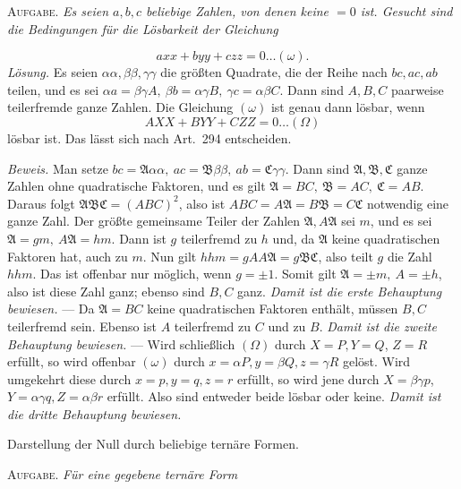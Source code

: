 \textsc{Aufgabe.} \textit{Es seien \(a,b,c\) beliebige Zahlen, von denen keine \(=0\) ist. Gesucht sind die Bedingungen für die Lösbarkeit der Gleichung}

\[axx+byy+czz=0\ldots(\omega).\]
\textit{Lösung.} Es seien \(\alpha\alpha,\beta\beta,\gamma\gamma\) die größten Quadrate, die der Reihe nach \(bc,ac,ab\) teilen, und es sei \(\alpha a=\beta\gamma A,\ \beta b=\alpha\gamma B,\ \gamma c=\alpha\beta C\). Dann sind \(A,B,C\) paarweise teilerfremde ganze Zahlen. Die Gleichung \((\omega)\) ist genau dann lösbar, wenn
\[AXX+BYY+CZZ=0\ldots(\Omega)\]
lösbar ist. Das lässt sich nach Art.\ 294 entscheiden.

\textit{Beweis.} Man setze \(bc=\mathfrak A\alpha\alpha,\ ac=\mathfrak B\beta\beta,\ ab=\mathfrak C\gamma\gamma\). Dann sind \(\mathfrak A,\mathfrak B,\mathfrak C\) ganze Zahlen ohne quadratische Faktoren, und es gilt \(\mathfrak A=BC,\ \mathfrak B=AC,\ \mathfrak C=AB\). Daraus folgt \(\mathfrak A\mathfrak B\mathfrak C=(ABC)^2\), also ist \(ABC=A\mathfrak A=B\mathfrak B=C\mathfrak C\) notwendig eine ganze Zahl. Der größte gemeinsame Teiler der Zahlen \(\mathfrak A,A\mathfrak A\) sei \(m\), und es sei \(\mathfrak A=gm,\ A\mathfrak A=hm\). Dann ist \(g\) teilerfremd zu \(h\) und, da \(\mathfrak A\) keine quadratischen Faktoren hat, auch zu \(m\). Nun gilt \(hhm=gAA\mathfrak A =g\mathfrak B\mathfrak C\), also teilt \(g\) die Zahl \(hhm\). Das ist offenbar nur möglich, wenn \(g=\pm1\). Somit gilt \(\mathfrak A=\pm m,\ A=\pm h\), also ist diese Zahl ganz; ebenso sind \(B,C\) ganz. \textit{Damit ist die erste Behauptung bewiesen.} — Da \(\mathfrak A=BC\) keine quadratischen Faktoren enthält, müssen \(B,C\) teilerfremd sein. Ebenso ist \(A\) teilerfremd zu \(C\) und zu \(B\). \textit{Damit ist die zweite Behauptung bewiesen.} — Wird schließlich \((\Omega)\) durch \(X=P,Y=Q\), \(Z=R\) erfüllt, so wird offenbar \((\omega)\) durch \(x=\alpha P,y=\beta Q,z=\gamma R\) gelöst. Wird umgekehrt diese durch \(x=p,y=q,z=r\) erfüllt, so wird jene durch \(X=\beta\gamma p\), \(Y=\alpha\gamma q,Z=\alpha\beta r\) erfüllt. Also sind entweder beide lösbar oder keine. \textit{Damit ist die dritte Behauptung bewiesen.}

\begin{center}Darstellung der Null durch beliebige ternäre Formen.\end{center}


\textsc{Aufgabe.} \textit{Für eine gegebene ternäre Form}

